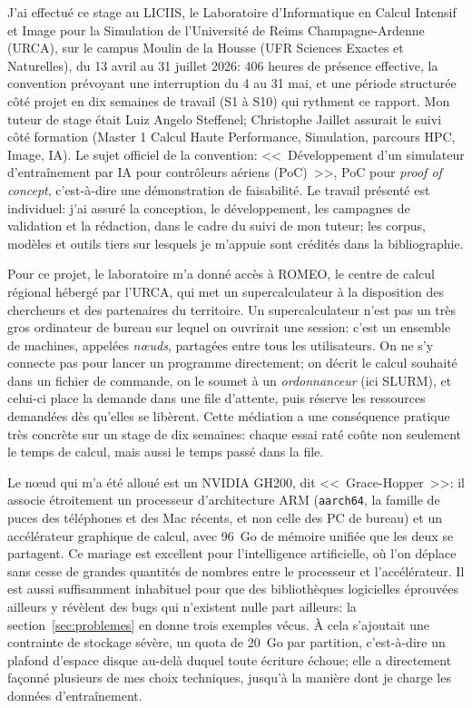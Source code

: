 \documentclass[11pt,a4paper]{article}
\begin{document}
J'ai effectué ce stage au LICIIS, le Laboratoire d'Informatique en Calcul Intensif et Image pour la Simulation de l'Université de Reims Champagne-Ardenne (URCA), sur le campus Moulin de la Housse (UFR Sciences Exactes et Naturelles), du 13 avril au 31 juillet 2026: 406 heures de présence effective, la convention prévoyant une interruption du 4 au 31 mai, et une période structurée côté projet en dix semaines de travail (S1 à S10) qui rythment ce rapport. Mon tuteur de stage était Luiz Angelo Steffenel; Christophe Jaillet assurait le suivi côté formation (Master 1 Calcul Haute Performance, Simulation, parcours HPC, Image, IA). Le sujet officiel de la convention: <<~Développement d'un simulateur d'entraînement par IA pour contrôleurs aériens (PoC)~>>, PoC pour \emph{proof of concept}, c'est-à-dire une démonstration de faisabilité. Le travail présenté est individuel: j'ai assuré la conception, le développement, les campagnes de validation et la rédaction, dans le cadre du suivi de mon tuteur; les corpus, modèles et outils tiers sur lesquels je m'appuie sont crédités dans la bibliographie.

Pour ce projet, le laboratoire m'a donné accès à ROMEO, le centre de calcul régional hébergé par l'URCA, qui met un supercalculateur à la disposition des chercheurs et des partenaires du territoire. Un supercalculateur n'est pas un très gros ordinateur de bureau sur lequel on ouvrirait une session: c'est un ensemble de machines, appelées \emph{n\oe uds}, partagées entre tous les utilisateurs. On ne s'y connecte pas pour lancer un programme directement; on décrit le calcul souhaité dans un fichier de commande, on le soumet à un \emph{ordonnanceur} (ici SLURM), et celui-ci place la demande dans une file d'attente, puis réserve les ressources demandées dès qu'elles se libèrent. Cette médiation a une conséquence pratique très concrète sur un stage de dix semaines: chaque essai raté coûte non seulement le temps de calcul, mais aussi le temps passé dans la file.

Le n\oe ud qui m'a été alloué est un NVIDIA GH200, dit <<~Grace-Hopper~>>: il associe étroitement un processeur d'architecture ARM (\texttt{aarch64}, la famille de puces des téléphones et des Mac récents, et non celle des PC de bureau) et un accélérateur graphique de calcul, avec 96~Go de mémoire unifiée que les deux se partagent. Ce mariage est excellent pour l'intelligence artificielle, où l'on déplace sans cesse de grandes quantités de nombres entre le processeur et l'accélérateur. Il est aussi suffisamment inhabituel pour que des bibliothèques logicielles éprouvées ailleurs y révèlent des bugs qui n'existent nulle part ailleurs: la section~\ref{sec:problemes} en donne trois exemples vécus. À cela s'ajoutait une contrainte de stockage sévère, un quota de 20~Go par partition, c'est-à-dire un plafond d'espace disque au-delà duquel toute écriture échoue; elle a directement façonné plusieurs de mes choix techniques, jusqu'à la manière dont je charge les données d'entraînement.
\end{document}
